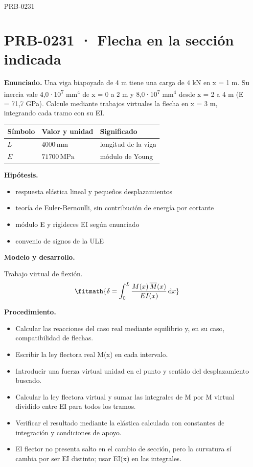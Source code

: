 \begin{studiumworked}{PRB-0231}

\section{PRB-0231 · Flecha en la sección indicada}

\textbf{Enunciado.} Una viga biapoyada de 4 m tiene una carga de 4 kN en x = 1 m. Su inercia vale 4,0·10\textsuperscript{7} mm$^4$ de x = 0 a 2 m y 8,0·10\textsuperscript{7} mm$^4$ desde x = 2 a 4 m (E = 71,7 GPa). Calcule mediante trabajos virtuales la flecha en x = 3 m, integrando cada tramo con su EI.

\par\medskip\noindent\begin{tabular}{@{}p{.18\linewidth}p{.26\linewidth}p{.48\linewidth}@{}}
\toprule Símbolo & Valor y unidad & Significado\\\midrule
$L$ & $4000\,\mathrm{mm}$ & longitud de la viga\\
$E$ & $71700\,\mathrm{MPa}$ & módulo de Young\\
\bottomrule\end{tabular}\par\medskip

\textbf{Hipótesis.}\begin{itemize}\item respuesta elástica lineal y pequeños desplazamientos
\item teoría de Euler-Bernoulli, sin contribución de energía por cortante
\item módulo E y rigideces EI según enunciado
\item convenio de signos de la ULE\end{itemize}

\textbf{Modelo y desarrollo.}

Trabajo virtual de flexión.\[\fitmath{\delta = \int_{0}^{L}\frac{M(x)\,\overline{M}(x)}{E I(x)}\,\mathrm{d}x}\]

\textbf{Procedimiento.}\begin{itemize}\item Calcular las reacciones del caso real mediante equilibrio y, en su caso, compatibilidad de flechas.
\item Escribir la ley flectora real M(x) en cada intervalo.
\item Introducir una fuerza virtual unidad en el punto y sentido del desplazamiento buscado.
\item Calcular la ley flectora virtual y sumar las integrales de M por M virtual dividido entre EI para todos los tramos.
\item Verificar el resultado mediante la elástica calculada con constantes de integración y condiciones de apoyo.
\item El flector no presenta salto en el cambio de sección, pero la curvatura sí cambia por ser EI distinto; usar EI(x) en las integrales.\end{itemize}


\end{studiumworked}
